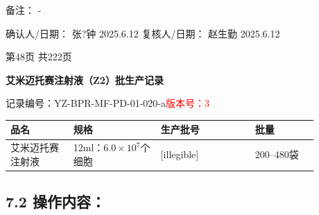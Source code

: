 \documentclass[UTF8,10pt,a4paper,fontset=fandol]{ctexart}
\newcommand{\fieldvalue}[1]{#1}
\newcommand{\handwritten}[1]{#1}
\begin{document}
备注：%
\fieldvalue{\handwritten{-}}

\vspace{0.3em}

确认人/日期：%
\fieldvalue{\handwritten{张?钟}}\quad
\fieldvalue{\handwritten{2025.6.12}}
\qquad
复核人/日期：%
\fieldvalue{\handwritten{赵生勤}}\quad
\fieldvalue{\handwritten{2025.6.12}}

\begin{center}
第48页 共222页
\end{center}

\newpage

\begin{center}
\textbf{艾米迈托赛注射液（Z2）批生产记录}
\end{center}

\noindent
记录编号：YZ-BPR-MF-PD-01-020-a\quad\textcolor{red}{版本号：3}

\begin{center}
\begin{tabular}{|p{0.18\linewidth}|p{0.25\linewidth}|p{0.27\linewidth}|p{0.18\linewidth}|}
\hline
\centering 品名 & \centering 规格 & \centering 生产批号 & \centering 批量 \tabularnewline
\hline
艾米迈托赛注射液 &
12ml：$6.0\times 10^{7}$个细胞 &
\fieldvalue{\handwritten{[illegible]}} &
200--480袋
\tabularnewline
\hline
\end{tabular}
\end{center}

\subsection*{7.2 操作内容：}
\end{document}
